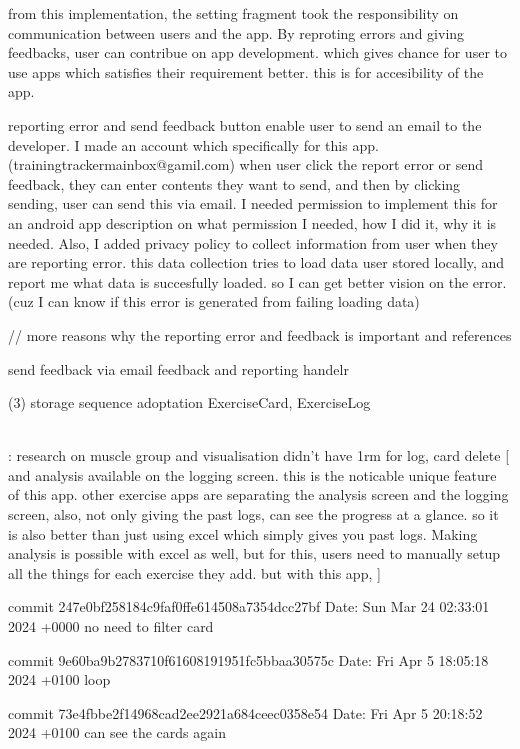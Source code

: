 from this implementation, the setting fragment took the responsibility on communication between users and the app.
By reproting errors and giving feedbacks, user can contribue on app development.
which gives chance for user to use apps which satisfies their requirement better.
this is for accesibility of the app.

reporting error and send feedback button enable user to send an email to the developer.
I made an account which specifically for this app. (trainingtrackermainbox@gamil.com)
when user click the report error or send feedback, they can enter contents they want to send, and then by clicking sending,
user can send this via email.
I needed permission to implement this for an android app
{description on what permission I needed, how I did it, why it is needed.}
Also, I added privacy policy to collect information from user when they are reporting error.
this data collection tries to load data user stored locally,
and report me what data is succesfully loaded.
so I can get better vision on the error. (cuz I can know if this error is generated from failing loading data)

// more reasons why the reporting error and feedback is important and references

send feedback via email
feedback and reporting handelr


(3) storage sequence adoptation 
    ExerciseCard, ExerciseLog




\\ : 
research on muscle group and visualisation
didn't have 1rm for log, card
delete [
    and analysis available on the logging screen. 
this is the noticable unique feature of this app. 
other exercise apps are separating the analysis screen and the logging screen, 
also, not only giving the past logs, can see the progress at a glance. 
so it is also better than just using excel which simply gives you past logs.
Making analysis is possible with excel as well, but for this, users need to manually setup all the things for each exercise they add.
but with this app, 
]


commit 247e0bf258184c9faf0ffe614508a7354dcc27bf
Date:   Sun Mar 24 02:33:01 2024 +0000
    no need to filter card

commit 9e60ba9b2783710f61608191951fc5bbaa30575c
Date:   Fri Apr 5 18:05:18 2024 +0100
    loop

commit 73e4fbbe2f14968cad2ee2921a684ceec0358e54
Date:   Fri Apr 5 20:18:52 2024 +0100
    can see the cards again

